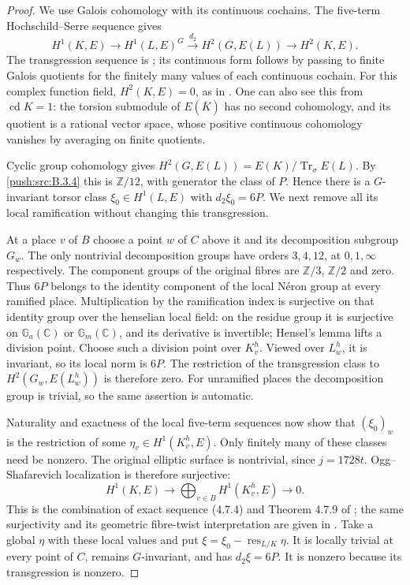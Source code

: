 \begin{proof}
We use Galois cohomology with its
continuous cochains. The five-term
Hochschild--Serre sequence gives
\[
 H^1(K,E)\longrightarrow H^1(L,E)^G
 \xrightarrow{\ d_2\ }H^2(G,E(L))
 \longrightarrow H^2(K,E).
\]
The transgression sequence is
\cite[Chapter III, Section 4, Theorem 2
and the following remark, pp.129--130]{HS53};
its continuous form follows by passing
to finite Galois quotients for the
finitely many values of each continuous
cochain. For this complex function field,
$H^2(K,E)=0$, as in
\cite[Lemma 4.7.8]{CDL24}.
One can also see this from
$\operatorname{cd}K=1$: the torsion
submodule of $E(\overline K)$ has no
second cohomology, and its quotient is
a rational vector space, whose positive
continuous cohomology vanishes by
averaging on finite quotients.

Cyclic group cohomology gives
$H^2(G,E(L))=E(K)/\operatorname{Tr}_\sigma E(L)$.
By \ref{push:src:B.3.4} this is $\mathbb Z/12$, with
generator the class of $P$. Hence there
is a $G$-invariant torsor class
$\xi_0\in H^1(L,E)$ with $d_2\xi_0=6P$.
We next remove all its local ramification
without changing this transgression.

At a place $v$ of $B$ choose a point
$w$ of $C$ above it and its decomposition
subgroup $G_w$. The only nontrivial
decomposition groups have orders
$3,4,12$, at $0,1,\infty$ respectively.
The component groups of the original
fibres are $\mathbb Z/3$, $\mathbb Z/2$
and zero. Thus $6P$ belongs to the
identity component of the local N\'eron
group at every ramified place.
Multiplication by the ramification
index is surjective on that identity
group over the henselian local field:
on the residue group it is surjective
on $\mathbb G_a(\mathbb C)$ or
$\mathbb G_m(\mathbb C)$, and its
derivative is invertible; Hensel's
lemma lifts a division point.
Choose such a division point over
$K_v^h$. Viewed over $L_w^h$, it is
invariant, so its local norm is $6P$.
The restriction of the transgression
class to $H^2(G_w,E(L_w^h))$ is
therefore zero. For unramified places
the decomposition group is trivial,
so the same assertion is automatic.

Naturality and exactness of the local
five-term sequences now show that
$(\xi_0)_w$ is the restriction of some
$\eta_v\in H^1(K_v^h,E)$.
Only finitely many of these classes
need be nonzero. The original elliptic
surface is nontrivial, since
$j=1728t$. Ogg--Shafarevich localization
is therefore surjective:
\[
 H^1(K,E)\longrightarrow
 \bigoplus_{v\in B}H^1(K_v^h,E)
 \longrightarrow0.
\]
This is the combination of exact
sequence (4.7.4) and Theorem 4.7.9
of \cite{CDL24}; the same surjectivity
and its geometric fibre-twist
interpretation are given in
\cite[Section 4, equation (4)]{Xiao91}.
Take a global $\eta$ with these local
values and put
$\xi=\xi_0-\operatorname{res}_{L/K}\eta$.
It is locally trivial at every point
of $C$, remains $G$-invariant, and has
$d_2\xi=6P$. It is nonzero because its
transgression is nonzero.


\end{proof}
